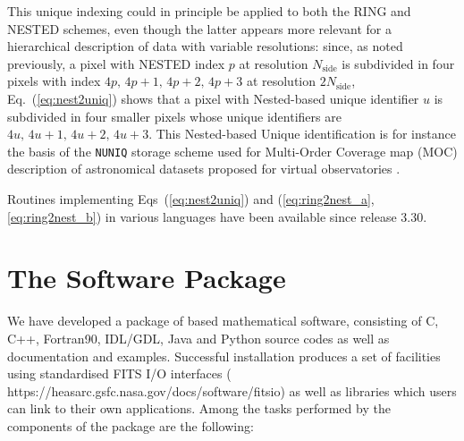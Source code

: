 \documentclass[12pt,twoside]{article}
\newcommand{\nside}{N_{\mathrm{side}}}
\begin{document}
This unique indexing could in principle be applied to both the RING and NESTED schemes, 
even though the latter appears more relevant for a hierarchical description 
of data with variable resolutions: since, as noted previously, a pixel with NESTED index $p$ 
at resolution $\nside$ is subdivided in four pixels with index $4p,\, 4p+1,\, 4p+2,\, 4p+3$ 
at resolution $2\nside$, Eq.~(\ref{eq:nest2uniq}) shows that
a pixel with Nested-based unique identifier $u$ is subdivided in four smaller pixels 
whose unique identifiers are $4u,\, 4u+1,\, 4u+2,\, 4u+3$.
This Nested-based Unique identification is for instance the basis of the \texttt{NUNIQ} storage scheme used for Multi-Order Coverage map (MOC) description of astronomical datasets proposed for virtual observatories \citep{moc}.

Routines implementing Eqs~(\ref{eq:nest2uniq}) and (\ref{eq:ring2nest_a}, \ref{eq:ring2nest_b}) in various languages have been available since release 3.30.


\section{The \healpix Software Package}

We have developed a package of \healpix based mathematical software, consisting
of C, C++, Fortran90, IDL/GDL, Java and Python source codes as well as documentation and
examples. Successful installation produces a set of facilities using standardised
FITS I/O interfaces 
(
{https://heasarc.gsfc.nasa.gov/docs/software/fitsio}) 
as well as 
libraries  which users can link to their own applications.
Among the tasks performed by the  components of the 
\healpix package  are the
following:
\end{document}

